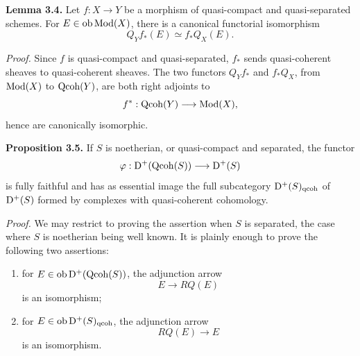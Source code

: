 \documentclass[11pt]{article}
\begin{document}
\textbf{Lemma 3.4.} Let $f:X\to Y$ be a morphism of quasi-compact and quasi-separated schemes. For $E\in\operatorname{ob}\operatorname{Mod}(X)$, there is a canonical functorial isomorphism
\[
Q_Y f_*(E)\simeq f_*Q_X(E).
\]

\emph{Proof.} Since $f$ is quasi-compact and quasi-separated, $f_*$ sends quasi-coherent sheaves to quasi-coherent sheaves. The two functors $Q_Y f_*$ and $f_*Q_X$, from $\operatorname{Mod}(X)$ to $\operatorname{Qcoh}(Y)$, are both right adjoints to
\[
f^*:\operatorname{Qcoh}(Y)\longrightarrow\operatorname{Mod}(X),
\]
hence are canonically isomorphic.

\textbf{Proposition 3.5.} If $S$ is noetherian, or quasi-compact and separated, the functor
\[
\varphi:\mathrm D^+(\operatorname{Qcoh}(S))\longrightarrow\mathrm D^+(S)
\]
is fully faithful and has as essential image the full subcategory $\mathrm D^+(S)_{\mathrm{qcoh}}$ of $\mathrm D^+(S)$ formed by complexes with quasi-coherent cohomology.

\emph{Proof.} We may restrict to proving the assertion when $S$ is separated, the case where $S$ is noetherian being well known. It is plainly enough to prove the following two assertions:
\begin{enumerate}[label=(3.5.\arabic*)]
\item for $E\in\operatorname{ob}\mathrm D^+(\operatorname{Qcoh}(S))$, the adjunction arrow
\[
E\longrightarrow RQ(E)
\]
is an isomorphism;
\item for $E\in\operatorname{ob}\mathrm D^+(S)_{\mathrm{qcoh}}$, the adjunction arrow
\[
RQ(E)\longrightarrow E
\]
is an isomorphism.
\end{enumerate}
\end{document}
